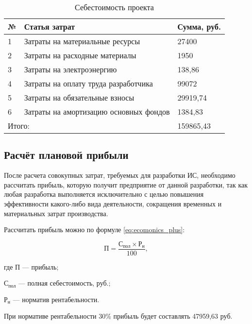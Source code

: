 \begin{footnotesize}
\begin{longtable}[h]{|p{}|p{}|p{}|}
	\caption{\label{tab:sebest}Себестоимость проекта} \\
	\hline
		\textbf{№} &
		\textbf{Статья затрат} &
		\textbf{Сумма, руб.} \\
	\hline
		1 & Затраты на материальные ресурсы & 27400 \\ \hline
		2 & Затраты на расходные материалы & 1950 \\ \hline
		3 & Затраты на электроэнергию & 138,86 \\ \hline
		4 & Затраты на оплату труда разработчика & 99072 \\ \hline
		5 & Затраты на обязательные взносы & 29919,74 \\ \hline
		6 & Затраты на амортизацию основных фондов & 1384,83 \\ \hline
		\multicolumn{2}{|l|}{Итого:} & 159865,43 \\ \hline
\end{longtable}
\end{footnotesize}

\subsection{Расчёт плановой прибыли}

После расчета совокупных затрат, требуемых для разработки ИС, необходимо рассчитать прибыль, которую получит предприятие от данной разработки, так как любая разработка выполняется исключительно с целью повышения эффективности какого-либо вида деятельности, сокращения временных и материальных затрат производства.

Рассчитать прибыль можно по формуле \ref{eq:ecomonics_plus}:

\begin{equation}
	\label{eq:ecomonics_plus}
	П = \frac{С_{пол} \times Р_{н}}{100},
\end{equation}
\begin{ESKDexplanation}
	\item где $П$ --- прибыль;
	\item $С_{пол}$ --- полная себестоимость, руб.;
	\item $Р_{н}$ --- норматив рентабельности.
\end{ESKDexplanation}

При нормативе рентабельности 30\% прибыль будет составлять 47959,63 руб.

